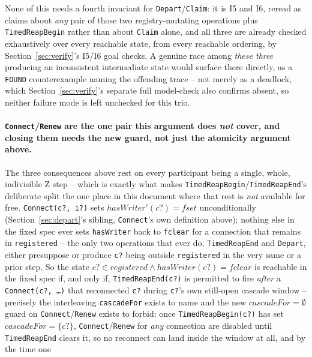\documentclass[a4paper,10pt,fleqn]{article}
\begin{document}
None of this needs a fourth invariant for \texttt{Depart}/\texttt{Claim}:
it is I5 and I6, reread as claims about \emph{any} pair of those two
registry-mutating operations plus \texttt{TimedReapBegin} rather than
about \texttt{Claim} alone, and all three are already checked exhaustively
over every reachable state, from every reachable ordering, by
Section~\ref{sec:verify}'s I5/I6 goal checks. A genuine race among
\emph{these three} producing an inconsistent intermediate state would
surface there directly, as a \texttt{FOUND} counterexample naming the
offending trace -- not merely as a deadlock, which
Section~\ref{sec:verify}'s separate full model-check also confirms absent,
so neither failure mode is left unchecked for this trio.

\paragraph{\texttt{Connect}/\texttt{Renew} are the one pair this argument
does \emph{not} cover, and closing them needs the new guard, not just the
atomicity argument above.}
\label{sec:reconnect-race}
The three consequences above rest on every participant being a single,
whole, indivisible Z step -- which is exactly what makes
\texttt{TimedReapBegin}/\texttt{TimedReapEnd}'s deliberate split the one
place in this document where that rest is \emph{not} available for free.
\texttt{Connect(c?, i?)} sets \texttt{$hasWriter'(c?) = fset$}
unconditionally (Section~\ref{sec:depart}'s sibling, \texttt{Connect}'s own
definition above); nothing else in the fixed spec ever sets
\texttt{hasWriter} back to \texttt{fclear} for a connection that remains in
\texttt{registered} -- the only two operations that ever do,
\texttt{TimedReapEnd} and \texttt{Depart}, either presuppose or produce
\texttt{c?} being outside \texttt{registered} in the very same or a prior
step. So the state
\texttt{$c? \in registered \land hasWriter(c?) = fclear$} is reachable in
the fixed spec if, and only if, \texttt{TimedReapEnd(c?)} is permitted to
fire \emph{after} a \texttt{Connect(c?, \ldots)} that reconnected \texttt{c?}
during \texttt{c?}'s own still-open cascade window -- precisely the
interleaving \texttt{cascadeFor} exists to name and the new
\texttt{$cascadeFor = \emptyset$} guard on \texttt{Connect}/\texttt{Renew}
exists to forbid: once \texttt{TimedReapBegin(c?)} has set
\texttt{$cascadeFor = \{c?\}$}, \texttt{Connect}/\texttt{Renew} for
\emph{any} connection are disabled until \texttt{TimedReapEnd} clears it,
so no reconnect can land inside the window at all, and by the time one
\end{document}
